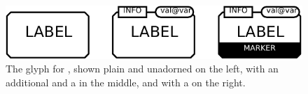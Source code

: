 \begin{figure}[H]
  \centering
  \includegraphics{images/build/complex_combined.pdf}
  \caption{The \PD glyph for , shown plain and unadorned on the left, with an additional  and a  in the middle, and with a  on the right.}
  \label{fig:complex}
\end{figure}
